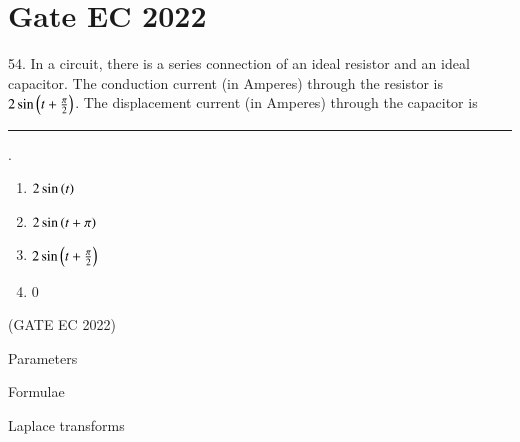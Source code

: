 \documentclass[journal,12pt,twocolumn]{IEEEtran}
\begin{document}


\vspace{3cm}

\title{}
\author{EE23BTECH11054 -  Sai Krishna Shanigarapu$^{*}$
}
\maketitle
\newpage
\bigskip


\section*{Gate EC 2022}
54. \hspace{2pt}In a circuit, there is a series connection of an ideal resistor and an ideal capacitor.
The conduction current (in Amperes) through the resistor is $2\sin\left(t + \frac{\pi}{2}\right)$. The displacement current (in Amperes) through the capacitor is \rule{1cm}{0.15mm}.\\ 
\begin{enumerate}[label=(\Alph*)]
    \item $2\sin\left(t\right)$
    \item $2\sin\left(t+\pi\right)$
    \item $2\sin\left(t +\frac{\pi}{2}\right)$
    \item $0$
\end{enumerate}
\hfill(GATE EC 2022)

\solution

\begin{table}[ht]
     \begin{adjustbox}{width=\columnwidth}
       
    \end{adjustbox}
    \caption{Parameters}
    \label{tab:tab_gate_ec_2022_24_1}
\end{table}


\begin{table}[ht]
     \begin{adjustbox}{width=\columnwidth}
       
    \end{adjustbox}
    \caption{Formulae}
    \label{tab:tab_gate_ec_2022_24_2}
\end{table}

\begin{table}[ht]
     \begin{adjustbox}{width=\columnwidth}
       
    \end{adjustbox}
    \caption{Laplace transforms}
    \label{tab:tab_gate_ec_2022_24_3}
\end{table}
\end{document}
